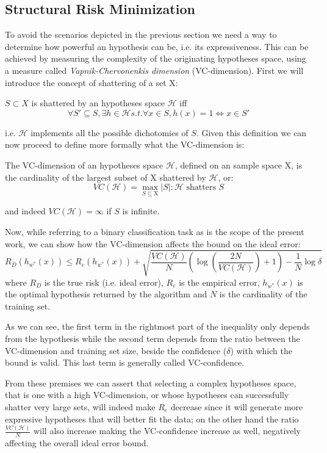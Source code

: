\subsection{Structural Risk Minimization}
\label{subsec:srm}
To avoid the scenarios depicted in the previous section we need a way to determine
how powerful an hypothesis can be, i.e. its expressiveness.
This can be achieved by measuring the complexity of the originating hypotheses space,
using a measure called \emph{Vapnik-Chervonenkis dimension} (VC-dimension).
First we will introduce the concept of shattering of a set $\mathrm{X}$:
\begin{definition}[Shattering]
    $S \subset X$ is shattered by an hypotheses space $\mathcal{H}$ iff
    \[\forall S' \subseteq S, \exists h \in \mathcal{H} s.t. \forall x \in S, h(x)=1 \iff x \in S'\]
\end{definition}
i.e. $\mathcal{H}$ implements all the possible dichotomies of $S$.
Given this definition we can now proceed to define more formally what the
VC-dimension is:
\begin{definition}[VC-dimension]
    The VC-dimension of an hypotheses space $\mathcal{H}$, defined on an sample
    space $\mathrm{X}$, is the cardinality of the largest subset of $\mathrm{X}$
    shattered by $\mathcal{H}$, or:
    \[VC(\mathcal{H}) = \max_{S\subseteq \mathrm{X}} |S| : \mathcal{H}\text{ shatters }S\]
\end{definition}
and indeed $VC(\mathcal{H})=\infty$ if $S$ is infinite.

Now, while referring to a binary classification task as is the scope of the present
work, we can show how the VC-dimension affects the bound on the ideal error:
\begin{displaymath}
    R_D(h_{w^*}(x)) \leq R_e(h_{w^*}(x)) + \sqrt{\frac{VC(\mathcal{H})}{N}
    (\log{(\frac{2N}{VC(\mathcal{H})})}+1) - \frac{1}{N}\log{\delta}}
\end{displaymath}
where $R_D$ is the true risk (i.e. ideal error), $R_e$ is the empirical error,
$h_{w^*}(x)$ is the optimal hypothesis returned by the algorithm and $N$ is the
cardinality of the training set.

As we can see, the first term in the rightmost part of the inequality only 
depends from the hypothesis while the second term depends from the ratio
between the VC-dimension and training set size, beside the confidence ($\delta$)
with which the bound is valid.
This last term is generally called VC-confidence.

From these premises we can assert that selecting a complex hypotheses space,
that is one with a high VC-dimension, or whose hypotheses can successfully shatter
very large sets, will indeed make $R_e$ decrease since it will generate more
expressive hypotheses that will better fit the data; on the other hand the ratio
$\frac{VC(\mathcal{H})}{N}$ will also increase making the VC-confidence increase
as well, negatively affecting the overall ideal error bound.

